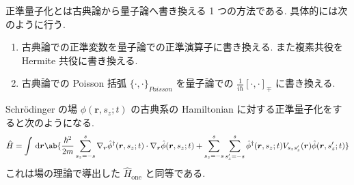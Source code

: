 \documentclass[uplatex,dvipdfmx,a4paper,11pt]{jlreq}
\newcommand{\rr}{\bm{r}}
\numberwithin{equation}{section}
\theoremstyle{definition}
\begin{document}
\begin{definition}[正準量子化]
  正準量子化とは古典論から量子論へ書き換える 1 つの方法である. 具体的には次のように行う.
  \begin{enumerate}
    \item 古典論での正準変数を量子論での正準演算子に書き換える. また複素共役を Hermite 共役に書き換える.
    \item 古典論での Poisson 括弧 $\{\cdot, \cdot\}_{Poisson}$ を量子論での $\frac{1}{i\hbar}[\cdot, \cdot]_\mp$ に書き換える.
  \end{enumerate}
\end{definition}
\begin{theorem}[Q21-101(i)(ii)]
  Schrödinger の場 $\phi(\rr, s_z; t)$ の古典系の Hamiltonian に対する正準量子化をすると次のようになる.
  \begin{align}
    \hat{H} = \int\dl{\rr}\ab\{\frac{\hbar^2}{2m}\sum_{s_z = -s}^{s}\nabla_{\rr}\hat{\phi}^\dagger(\rr, s_z; t)\cdot\nabla_{\rr}\hat{\phi}(\rr, s_z; t) + \sum_{s_z = -s}^{s}\sum_{s_z' = -s}^{s}\hat{\phi}^\dagger(\rr, s_z; t)V_{s_zs_z'}(\rr)\hat{\phi}(\rr, s_z'; t)\}
  \end{align}
  これは場の理論で導出した $\hat{H}_{\mathrm{one}}$ と同等である.
\end{theorem}
\end{document}
